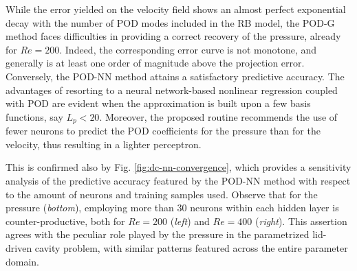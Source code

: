 \documentclass[longtitle]{elsarticle}
\numberwithin{equation}{section}
\theoremstyle{theorem}
\theoremstyle{definition}
\theoremstyle{remark}
\theoremstyle{proposition}
\numberwithin{figure}{section}
\begin{document}
		While the error yielded on the velocity field shows an almost perfect exponential decay with the number of POD modes included in the RB model, the POD-G method faces difficulties in providing a correct recovery of the pressure, already for $Re = 200$. Indeed, the corresponding error curve is not monotone, and generally is at least one order of magnitude above the projection error. Conversely, the POD-NN method attains a satisfactory predictive accuracy. The advantages of resorting to a neural network-based nonlinear regression coupled with POD are evident when the approximation is built upon a few basis functions, say $L_p < 20$. Moreover, the proposed routine recommends the use of fewer neurons to predict the POD coefficients for the pressure than for the velocity, thus resulting in a lighter perceptron. 
		
		This is confirmed also by Fig. \ref{fig:dc-nn-convergence}, which provides a sensitivity analysis of the predictive accuracy featured by the POD-NN method with respect to the amount of neurons and training samples used. Observe that for the pressure (\textcolor{deepgreen}{\emph{bottom}}), employing more than $30$ neurons within each hidden layer is counter-productive, both for $Re = 200$ (\textcolor{deepgreen}{\emph{left}}) and $Re = 400$ (\textcolor{deepgreen}{\emph{right}}). This assertion agrees with the peculiar role played by the pressure in the parametrized lid-driven cavity problem, with similar patterns featured across the entire parameter domain. 
		
\end{document}
